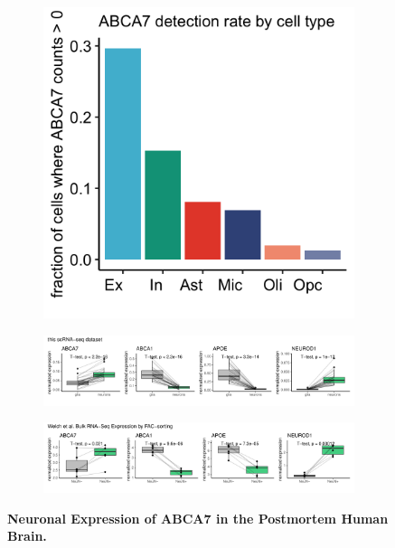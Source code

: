 \documentclass[12pt]{article}
\begin{document}
\begin{figure}[H]
    \begin{subfigure}[t]{.25\textwidth}
        \caption{}
        \includegraphics[width=\textwidth]{./extended_plots/abca7_detection_rate.png}        
    \end{subfigure}
    \par
    \begin{subfigure}[t]{\textwidth}
        \caption{}
        \includegraphics[width=\textwidth]{./extended_plots/scRNAseq_bulk_rna.pdf}        
    \end{subfigure}
    \par
    \begin{subfigure}[t]{\textwidth}
        \caption{}
        \includegraphics[width=\textwidth]{./extended_plots/welch_et_al_bulk_rna.pdf}        
    \end{subfigure}
    \caption{
        \textbf{Neuronal Expression of ABCA7 in the Postmortem Human Brain.}\\
    }
    \label{fig:abca7_expression}
\end{figure}
\end{document}
